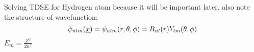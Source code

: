 Solving TDSE for Hydrogen atom because it will be important later. also note the structure of wavefunction:
\begin{equation*}
    \psi_{nlm}(\underline{x}) = \psi_{nlm}(r,\theta,\phi) = R_{nl}(r)Y_{lm}(\theta, \phi)
\end{equation*}
$E_m=\frac{Z^2}{2n^2}$